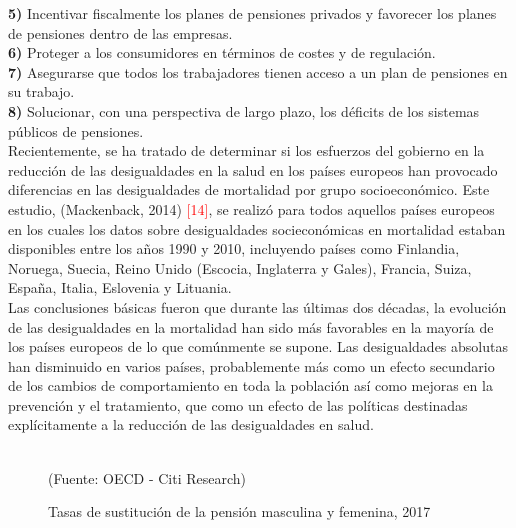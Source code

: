 \vspace{-0.3cm}
\noindent \textbf{5)} Incentivar fiscalmente los planes de pensiones privados y favorecer los planes de pensiones dentro de las empresas.\\

\vspace{-0.3cm}
\noindent \textbf{6)} Proteger a los consumidores en t\'erminos de costes y de regulaci\'on.\\

\vspace{-0.3cm}
\noindent \textbf{7)} Asegurarse que todos los trabajadores tienen acceso a un plan de pensiones en su trabajo.\\

\vspace{-0.3cm}
\noindent \textbf{8)} Solucionar, con una perspectiva de largo plazo, los d\'eficits de los sistemas p\'ublicos de pensiones.\\

\noindent Recientemente, se ha tratado de determinar si los esfuerzos del gobierno en la reducci\'on de las desigualdades en la salud en los pa\'ises europeos han provocado diferencias en las desigualdades de mortalidad por grupo socioecon\'omico. Este estudio, (Mackenback, 2014) \textcolor{red}{[14]}, se realiz\'o para todos aquellos pa\'ises europeos en los cuales los datos sobre desigualdades sociecon\'omicas en mortalidad estaban disponibles entre los a\~nos 1990 y 2010, incluyendo pa\'ises como Finlandia, Noruega, Suecia, Reino Unido (Escocia, Inglaterra y Gales), Francia, Suiza, Espa\~na, Italia, Eslovenia y Lituania.\\
Las conclusiones b\'asicas fueron que durante las \'ultimas dos d\'ecadas, la evoluci\'on de las desigualdades en la mortalidad han sido más favorables en la mayor\'ia de los pa\'ises europeos de lo que com\'unmente se supone. Las desigualdades absolutas han disminuido en varios pa\'ises, probablemente m\'as como un efecto secundario de los cambios de comportamiento en toda la poblaci\'on as\'i como mejoras en la prevenci\'on y el tratamiento, que como un efecto de las pol\'iticas destinadas expl\'icitamente a la reducci\'on de las desigualdades en salud.

\begin{figure}[!ht]
\centering
{}
\caption{Tasas de sustituci\'on de la pensi\'on masculina y femenina, 2017}\\
\small{(Fuente: OECD - Citi Research)}
\end{figure}

